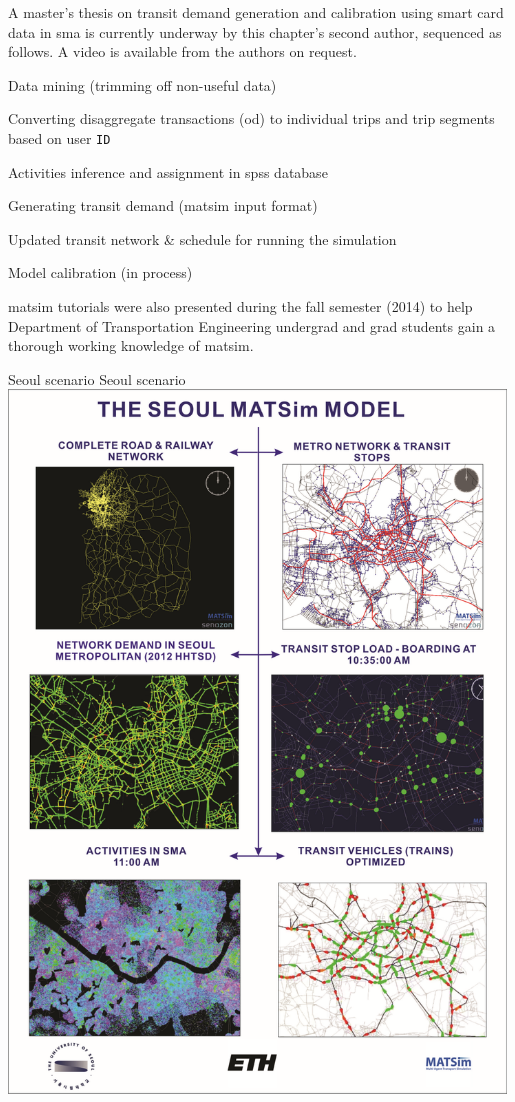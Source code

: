 A master's thesis on transit demand generation and calibration using smart card data in \gls{sma} is currently underway by this chapter's second author, sequenced as follows. A video is available from the authors on request.
%
\begin{compactitem}
\item Data mining (trimming off non-useful data)
\item	Converting disaggregate transactions (\gls{od}) to individual trips and trip segments based on user \lstinline|ID|
\item	Activities inference and assignment in \gls{spss} database
\item	Generating transit demand (\gls{matsim} input format)
\item	Updated transit network \& schedule for running the simulation
\item	Model calibration (in process)
\end{compactitem}
%
\gls{matsim} tutorials were also presented during the fall semester (2014) to help Department of Transportation Engineering undergrad and grad students gain a thorough working knowledge of \gls{matsim}.

\createfigure%
{Seoul scenario}%
{Seoul scenario}%
{\label{fig:seoul}}%
{\includegraphics[width=0.99\textwidth, angle=0]{using/figures/seoul}}%
{}

 
 
